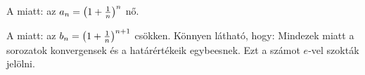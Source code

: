 A \amgm{}miatt:
az $a_n={ \left( 1+\frac{1}{n} \right) }^{n}$ \szigmon{}nő.


A \gmhm{}miatt:
az $b_n={ \left( 1+\frac{1}{n} \right) }^{n+1}$ \szigmon{}csökken.
Könnyen látható, hogy:
Mindezek miatt a sorozatok konvergensek és a határértékeik egybeesnek. Ezt
a számot $e$-vel szokták jelölni.
